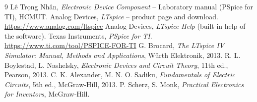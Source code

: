 \begin{thebibliography}{9}
 Lê Trọng Nhân, \textit{Electronic Device Component} -- Laboratory manual (PSpice for TI), HCMUT.
 Analog Devices, \textit{LTspice} -- product page and download. \url{https://www.analog.com/ltspice}
 Analog Devices, \textit{LTspice Help} (built-in help of the software).
 Texas Instruments, \textit{PSpice for TI}. \url{https://www.ti.com/tool/PSPICE-FOR-TI}
 G. Brocard, \textit{The LTspice IV Simulator: Manual, Methods and Applications}, Würth Elektronik, 2013.
 R. L. Boylestad, L. Nashelsky, \textit{Electronic Devices and Circuit Theory}, 11th ed., Pearson, 2013.
 C. K. Alexander, M. N. O. Sadiku, \textit{Fundamentals of Electric Circuits}, 5th ed., McGraw-Hill, 2013.
 P. Scherz, S. Monk, \textit{Practical Electronics for Inventors}, McGraw-Hill.
\end{thebibliography}
